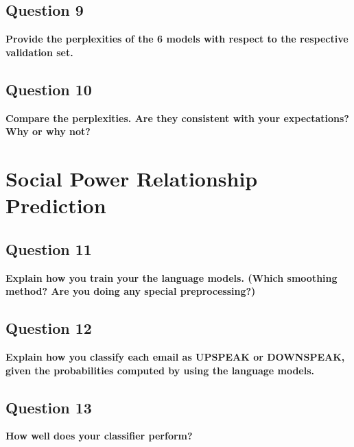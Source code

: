 \documentclass{article} %
\begin{document}
\subsection*{Question 9}

\textbf{Provide the perplexities of the 6 models with respect to the respective validation set.}
\\


\lipsum[2] %

\subsection*{Question 10}

\textbf{Compare the perplexities. Are they consistent with your expectations? Why or why not?}
\\

\lipsum[2]

\section{Social Power Relationship Prediction}


\subsection*{Question 11}

\textbf{Explain how you train your the language models. (Which smoothing method? Are you doing any special preprocessing?)}
\\


\lipsum[2] %

\subsection*{Question 12}

\textbf{Explain how you classify each email as UPSPEAK or DOWNSPEAK, given the probabilities computed by using the language models.}


\lipsum[2]

\subsection*{Question 13}

\textbf{How well does your classifier perform?}


\lipsum[2]
\end{document}

